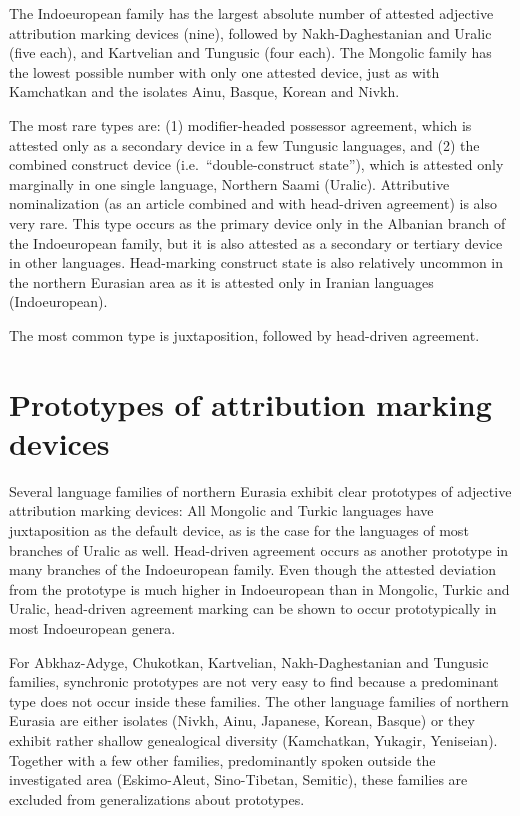 The Indoeuropean family has the largest absolute number of attested adjective attribution marking devices (nine), followed by Nakh-Daghestanian and Uralic (five each), and Kartvelian and Tungusic (four each). The Mongolic family has the lowest possible number with only one attested device, just as with Kamchatkan and the isolates Ainu, Basque, Korean and Nivkh.

The most rare types are:  (1) modifier-headed possessor agreement, which is attested only as a secondary device in a few Tungusic languages, and (2) the combined construct device (i.e.~“double-construct state”), which is attested only marginally in one single language, Northern Saami (Uralic). Attributive nominalization (as an article combined and with head-driven agreement) is also very rare. This type occurs as the primary device only in the Albanian branch of the Indoeuropean family, but it is also attested as a secondary or tertiary device in other languages. Head-marking construct state is also relatively uncommon in the northern Eurasian area as it is attested only in Iranian languages (Indoeuropean).

The most common type is juxtaposition, followed by head-driven agreement.

\section{Prototypes of attribution marking devices}
Several language families of northern Eurasia exhibit clear prototypes of adjective attribution marking devices: All Mongolic and Turkic languages have juxtaposition as the default device, as is the case for the languages of most branches of Uralic as well. Head-driven agreement occurs as another prototype in many branches of the Indoeuropean family. Even though the attested deviation from the prototype is much higher in Indoeuropean than in Mongolic, Turkic and Uralic, head-driven agreement marking can be shown to occur prototypically in most Indoeuropean genera.

For Abkhaz-Adyge, Chukotkan, Kartvelian, Nakh-Daghestanian and Tungusic families, synchronic prototypes are not very easy to find because a predominant type does not occur inside these families. The other language families of northern Eurasia are either isolates (Nivkh, Ainu, Japanese, Korean, Basque) or they exhibit rather shallow genealogical diversity (Kamchatkan, Yukagir, Yeniseian). Together with a few other families, predominantly spoken outside the investigated area (Eskimo-Aleut, Sino-Tibetan, Semi\-tic), these families are excluded from generalizations about prototypes. 

